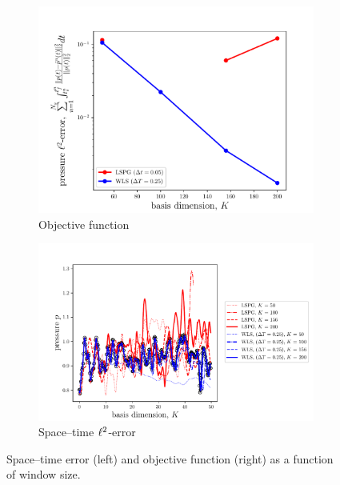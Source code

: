 \begin{figure}
\begin{center}
\begin{subfigure}[t]{0.45\textwidth}
\includegraphics[trim={0cm 0cm 0cm 0cm},clip,width=1.\linewidth]{figs/cavity_new/perror_vs_basisSize.pdf}
\caption{Objective function} 
\label{fig:cav_results_pressurea}
\end{subfigure}
\begin{subfigure}[t]{0.54\textwidth}
\includegraphics[trim={0cm 0cm 0cm 0cm},clip,width=1.\linewidth]{figs/cavity_new/p_vs_basisSize.pdf}
\caption{Space--time $\ell^2$-error}
\label{fig:cav_results_pressureb}
\end{subfigure}
\end{center}
\caption{Space--time error (left) and objective function (right) as a function of window size.}
\label{fig:cav_results_pressure}
\end{figure}





